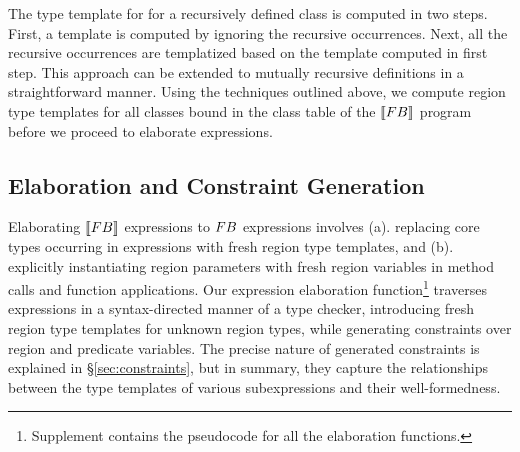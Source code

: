 The type template for for a recursively defined class is computed in
two steps. First, a template is computed by ignoring the recursive
occurrences. Next, all the recursive occurrences are templatized based
on the template computed in first step.  This approach can be extended
to mutually recursive definitions in a straightforward manner. Using
the techniques outlined above, we compute region type templates for
all classes bound in the class table of the $\llbracket {\sc FB} \rrbracket$ program
before we proceed to elaborate expressions.

%
%

\subsection{Elaboration and Constraint Generation}

Elaborating $\llbracket {\sc FB} \rrbracket$ expressions to ${\sc FB}$ expressions involves
(a). replacing core types occurring in expressions with fresh region
type templates, and (b). explicitly instantiating region parameters
with fresh region variables in method calls and function applications.
Our expression elaboration function\footnote{Supplement contains the
pseudocode for all the elaboration functions.} traverses expressions
in a syntax-directed manner of a type checker, introducing fresh
region type templates for unknown region types, while generating
constraints over region and predicate variables. The precise nature of
generated constraints is explained in \S\ref{sec:constraints}, but in
summary, they capture the relationships between the type templates of
various subexpressions and their well-formedness.

